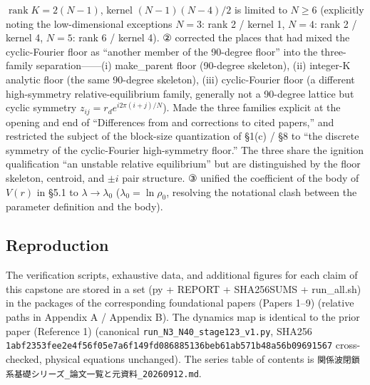 \documentclass[
  a4paper,
]{ltjsarticle}
\begin{document}
\begin{itemize}
  \(\operatorname{rank}K=2(N-1)\), kernel \((N-1)(N-4)/2\) is limited to
  \(N\ge6\) (explicitly noting the low-dimensional exceptions \(N=3\):
  rank 2 / kernel 1, \(N=4\): rank 2 / kernel 4, \(N=5\): rank 6 /
  kernel 4). ② corrected the places that had mixed the cyclic-Fourier
  floor as ``another member of the 90-degree floor'' into the
  three-family separation------(i) make\_parent floor (90-degree
  skeleton), (ii) integer-K analytic floor (the same 90-degree
  skeleton), (iii) cyclic-Fourier floor (a different high-symmetry
  relative-equilibrium family, generally not a 90-degree lattice but
  cyclic symmetry \(z_{ij}=r_de^{i2\pi(i+j)/N}\)). Made the three
  families explicit at the opening and end of ``Differences from and
  corrections to cited papers,'' and restricted the subject of the
  block-size quantization of §1(c) / §8 to ``the discrete symmetry of
  the cyclic-Fourier high-symmetry floor.'' The three share the ignition
  qualification ``an unstable relative equilibrium'' but are
  distinguished by the floor skeleton, centroid, and \(\pm i\) pair
  structure. ③ unified the coefficient of the body of \(V(r)\) in §5.1
  to \(\lambda\to\lambda_0\) (\(\lambda_0=\ln\rho_0\), resolving the
  notational clash between the parameter definition and the body).
\end{itemize}

\subsection{Reproduction}\label{reproduction}

The verification scripts, exhaustive data, and additional figures for
each claim of this capstone are stored in a set (py + REPORT +
SHA256SUMS + run\_all.sh) in the packages of the corresponding
foundational papers (Papers 1--9) (relative paths in Appendix A /
Appendix B). The dynamics map is identical to the prior paper (Reference
1) (canonical \texttt{run\_N3\_N40\_stage123\_v1.py}, SHA256
\texttt{1abf2353fee2e4f56f05e7a6f149fd086885136beb61ab571b48a56b09691567}
cross-checked, physical equations unchanged). The series table of
contents is
\texttt{関係波閉鎖系基礎シリーズ\_論文一覧と元資料\_20260912.md}.
\end{document}
